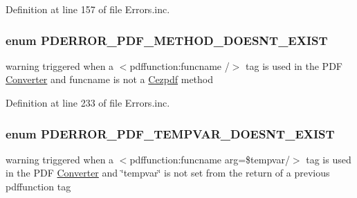 \-Definition at line 157 of file \-Errors.\-inc.

\hypertarget{_errors_8inc_a32fddf1bfab0b283beb6d44003fb5a94}{
\subsubsection[{\-P\-D\-E\-R\-R\-O\-R\-\_\-\-P\-D\-F\-\_\-\-M\-E\-T\-H\-O\-D\-\_\-\-D\-O\-E\-S\-N\-T\-\_\-\-E\-X\-I\-S\-T}]{\setlength{\rightskip}{0pt plus 5cm}enum {\bf \-P\-D\-E\-R\-R\-O\-R\-\_\-\-P\-D\-F\-\_\-\-M\-E\-T\-H\-O\-D\-\_\-\-D\-O\-E\-S\-N\-T\-\_\-\-E\-X\-I\-S\-T}}}\label{_errors_8inc_a32fddf1bfab0b283beb6d44003fb5a94}
warning triggered when a $<$pdffunction\-:funcname /$>$ tag is used in the \-P\-D\-F \hyperlink{class_converter}{\-Converter} and funcname is not a \hyperlink{class_cezpdf}{\-Cezpdf} method 

\-Definition at line 233 of file \-Errors.\-inc.

\hypertarget{_errors_8inc_a1b9e5b7684777580c471be7887162423}{
\subsubsection[{\-P\-D\-E\-R\-R\-O\-R\-\_\-\-P\-D\-F\-\_\-\-T\-E\-M\-P\-V\-A\-R\-\_\-\-D\-O\-E\-S\-N\-T\-\_\-\-E\-X\-I\-S\-T}]{\setlength{\rightskip}{0pt plus 5cm}enum {\bf \-P\-D\-E\-R\-R\-O\-R\-\_\-\-P\-D\-F\-\_\-\-T\-E\-M\-P\-V\-A\-R\-\_\-\-D\-O\-E\-S\-N\-T\-\_\-\-E\-X\-I\-S\-T}}}\label{_errors_8inc_a1b9e5b7684777580c471be7887162423}
warning triggered when a $<$pdffunction\-:funcname arg=\$tempvar/$>$ tag is used in the \-P\-D\-F \hyperlink{class_converter}{\-Converter} and \char`\"{}tempvar\char`\"{} is not set from the return of a previous pdffunction tag 

